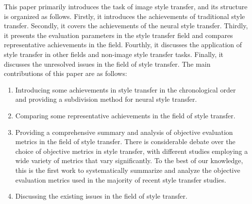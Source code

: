 This paper primarily introduces the task of image style transfer, and its structure is organized as follows. Firstly, it introduces the achievements of traditional style transfer. Secondly, it covers the achievements of the neural style transfer. Thirdly, it presents the evaluation parameters in the style transfer field and compares representative achievements in the field. Fourthly, it discusses the application of style transfer in other fields and non-image style transfer tasks. Finally, it discusses the unresolved issues in the field of style transfer. The main contributions of this paper are as follows:
\begin{enumerate}
    \item Introducing some achievements in style transfer in the chronological order and providing a subdivision method for neural style transfer.
    \item Comparing some representative achievements in the field of style transfer.
    \item Providing a comprehensive summary and analysis of objective evaluation metrics in the field of style transfer. There is considerable debate over the choice of objective metrics in style transfer, with different studies employing a wide variety of metrics that vary significantly. To the best of our knowledge, this is the first work to systematically summarize and analyze the objective evaluation metrics used in the majority of recent style transfer studies.
    \item Discussing the existing issues in the field of style transfer.
\end{enumerate}